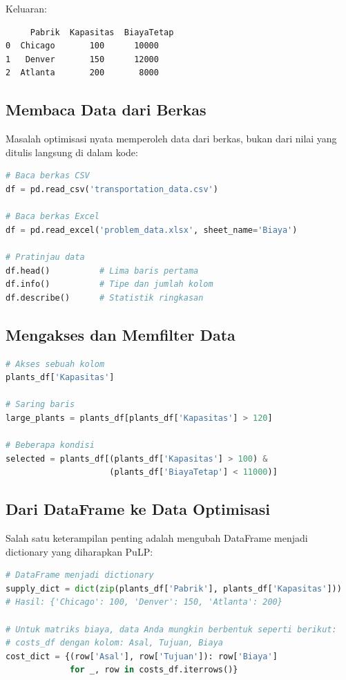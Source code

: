 Keluaran:
\begin{verbatim}
     Pabrik  Kapasitas  BiayaTetap
0  Chicago       100      10000
1   Denver       150      12000
2  Atlanta       200       8000
\end{verbatim}

\subsection{Membaca Data dari Berkas}

Masalah optimisasi nyata memperoleh data dari berkas, bukan dari nilai yang ditulis langsung di dalam kode:

\begin{lstlisting}[language=Python]
# Baca berkas CSV
df = pd.read_csv('transportation_data.csv')

# Baca berkas Excel
df = pd.read_excel('problem_data.xlsx', sheet_name='Biaya')

# Pratinjau data
df.head()          # Lima baris pertama
df.info()          # Tipe dan jumlah kolom
df.describe()      # Statistik ringkasan
\end{lstlisting}

\subsection{Mengakses dan Memfilter Data}

\begin{lstlisting}[language=Python]
# Akses sebuah kolom
plants_df['Kapasitas']

# Saring baris
large_plants = plants_df[plants_df['Kapasitas'] > 120]

# Beberapa kondisi
selected = plants_df[(plants_df['Kapasitas'] > 100) &
                     (plants_df['BiayaTetap'] < 11000)]
\end{lstlisting}

\subsection{Dari DataFrame ke Data Optimisasi}

Salah satu keterampilan penting adalah mengubah DataFrame menjadi dictionary yang diharapkan PuLP:

\begin{lstlisting}[language=Python]
# DataFrame menjadi dictionary
supply_dict = dict(zip(plants_df['Pabrik'], plants_df['Kapasitas']))
# Hasil: {'Chicago': 100, 'Denver': 150, 'Atlanta': 200}

# Untuk matriks biaya, data Anda mungkin berbentuk seperti berikut:
# costs_df dengan kolom: Asal, Tujuan, Biaya
cost_dict = {(row['Asal'], row['Tujuan']): row['Biaya']
             for _, row in costs_df.iterrows()}
\end{lstlisting}

